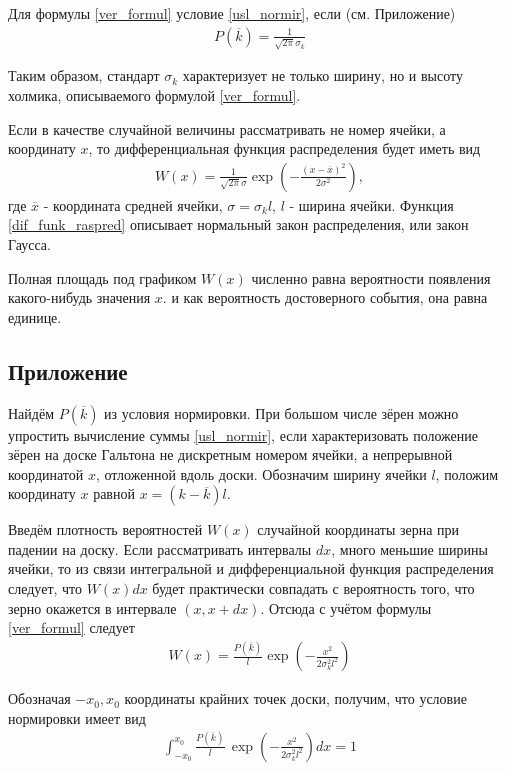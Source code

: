 Для формулы \eqref{ver_formul} условие \eqref{usl_normir}, если (см. Приложение)
\begin{align} \label{th:3:1}
	P(\overline{k}) = \frac{1}{\sqrt{2 \pi} \sigma_k}
\end{align}

Таким образом, стандарт $\sigma_k$ характеризует не только ширину, но и высоту холмика, описываемого формулой \eqref{ver_formul}.

Если в качестве случайной величины рассматривать не номер ячейки, а координату $x$, то дифференциальная функция распределения будет иметь вид
\begin{align} \label{dif_funk_raspred}
	W(x) = \frac{1}{\sqrt{2 \pi} \sigma} \exp \left(- \frac{(x - \overline{x})^2}{2 \sigma^2}\right),
\end{align}
где $\overline{x}$ - координата средней ячейки, $\sigma = \sigma_k l$, $l$ - ширина ячейки. Функция \eqref{dif_funk_raspred} описывает нормальный закон распределения, или закон Гаусса.

Полная площадь под графиком $W(x)$ численно равна вероятности появления какого-нибудь значения $x$. и как вероятность достоверного события, она равна единице.

\subsection{Приложение}
Найдём $P(\overline{k})$ из условия нормировки. При большом числе зёрен можно упростить вычисление суммы \eqref{usl_normir}, если характеризовать положение зёрен на доске Гальтона не дискретным номером ячейки, а непрерывной координатой $x$, отложенной вдоль доски. Обозначим ширину ячейки $l$, положим координату $x$ равной $x = (k - \overline{k})l$.

Введём плотность вероятностей $W(x)$ случайной координаты зерна при падении на доску. Если рассматривать интервалы $dx$, много меньшие ширины ячейки, то из связи интегральной и дифференциальной функция распределения следует, что $W(x)dx$ будет практически совпадать с вероятность того, что зерно окажется в интервале $(x, x + dx)$. Отсюда с учётом формулы \eqref{ver_formul} следует
\begin{align} \label{th:4:1}
	W(x) = \frac{P(\overline{k})}{l} \exp \left( - \frac{x^2}{2 \sigma_k^2 l^2}\right)
\end{align}

Обозначая $-x_0, x_0$ координаты крайних точек доски, получим, что условие нормировки имеет вид
\begin{align} \label{th:4:2}
	\int_{-x_0}^{x_0} { \frac{P(\overline{k})}{l}\, \exp \left( - \frac{x^2}{2 \sigma_k^2 l^2}\right) dx} = 1
\end{align}


